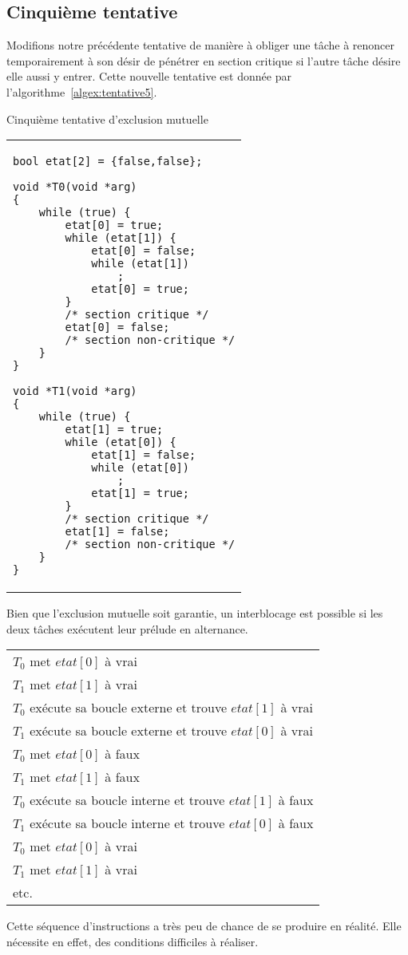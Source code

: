 \subsection*{Cinquième tentative}
Modifions notre précédente tentative de manière à obliger une tâche à renoncer temporairement à son désir de pénétrer en section critique si l'autre tâche désire elle aussi y entrer.
Cette nouvelle tentative est donnée par l'algorithme~\ref{algex:tentative5}.
\begin{algorithm}[!ht]
\caption{Cinquième tentative d'exclusion mutuelle}\label{algex:tentative5}
\begin{center}
\begin{tabular}{l}
\lstset{language=C++}
\begin{lstlisting}
bool etat[2] = {false,false};

void *T0(void *arg)
{
	while (true) {
		etat[0] = true;
		while (etat[1]) {
			etat[0] = false;
			while (etat[1])
				;
			etat[0] = true;
		}
		/* section critique */
		etat[0] = false;
		/* section non-critique */
	}
}

void *T1(void *arg)
{
	while (true) {
		etat[1] = true;
		while (etat[0]) {
			etat[1] = false;
			while (etat[0])
				;
			etat[1] = true;
		}
		/* section critique */
		etat[1] = false;
		/* section non-critique */
	}
}
\end{lstlisting}
\end{tabular}
\end{center}
\end{algorithm}

Bien que l'exclusion mutuelle soit garantie, un interblocage est possible si les deux tâches exécutent leur prélude en alternance.
\par\noindent
\begin{center}
\begin{tabular}{l}
$T_0$ met $etat[0]$ à vrai \\
$T_1$ met $etat[1]$ à vrai \\
$T_0$ exécute sa boucle externe et trouve $etat[1]$ à vrai \\
$T_1$ exécute sa boucle externe et trouve $etat[0]$ à vrai \\
$T_0$ met $etat[0]$ à faux  \\
$T_1$ met $etat[1]$ à faux \\
$T_0$ exécute sa boucle interne et trouve $etat[1]$ à faux \\
$T_1$ exécute sa boucle interne et trouve $etat[0]$ à faux \\
$T_0$ met $etat[0]$ à vrai \\
$T_1$ met $etat[1]$ à vrai \\
etc. \\
\end{tabular}
\end{center}
\par\noindent
Cette séquence d'instructions a très peu de chance de se produire en réalité. Elle nécessite en effet, des conditions difficiles à réaliser.

